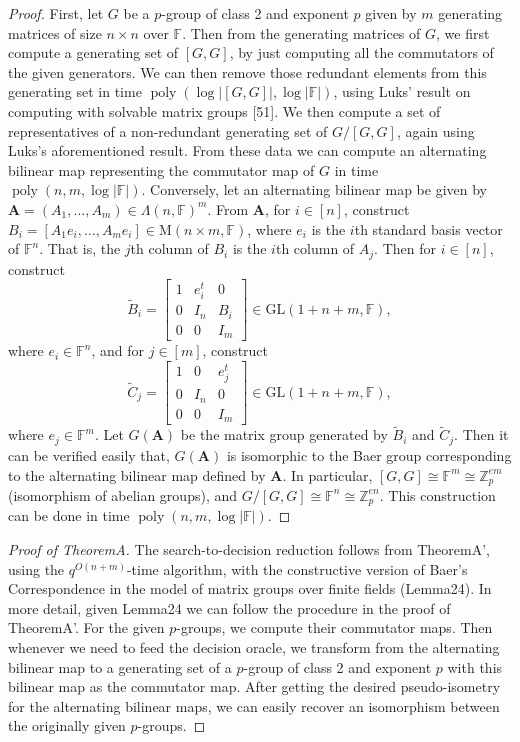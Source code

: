 \begin{proof}
First, let $G$ be a $p$-group of class 2 and exponent $p$ given by $m$ generating matrices of size $n\times n$ over $\mathbb F$. Then from the generating matrices of $G$, we first compute a generating set of $[G,G]$, by just computing all the commutators of the given generators. We can then remove those redundant elements from this generating set in time $\operatorname{poly}(\log|[G,G]|,\log|\mathbb F|)$, using Luks' result on computing with solvable matrix groups [51]. We then compute a set of representatives of a non-redundant generating set of $G/[G,G]$, again using Luks's aforementioned result. From these data we can compute an alternating bilinear map representing the commutator map of $G$ in time $\operatorname{poly}(n,m,\log|\mathbb F|)$.
Conversely, let an alternating bilinear map be given by $\mathbf A=(A_1,\ldots,A_m)\in\Lambda(n,\mathbb F)^m$. From $\mathbf A$, for $i\in[n]$, construct $B_i=[A_1e_i,\ldots,A_me_i]\in\mathrm M(n\times m,\mathbb F)$, where $e_i$ is the $i$th standard basis vector of $\mathbb F^n$. That is, the $j$th column of $B_i$ is the $i$th column of $A_j$. Then for $i\in[n]$, construct
\[\widetilde B_i=\begin{bmatrix}1&e_i^t&0\\0&I_n&B_i\\0&0&I_m\end{bmatrix}\in\mathrm{GL}(1+n+m,\mathbb F),\]
where $e_i\in\mathbb F^n$, and for $j\in[m]$, construct
\[\widetilde C_j=\begin{bmatrix}1&0&e_j^t\\0&I_n&0\\0&0&I_m\end{bmatrix}\in\mathrm{GL}(1+n+m,\mathbb F),\]
where $e_j\in\mathbb F^m$. Let $G(\mathbf A)$ be the matrix group generated by $\widetilde B_i$ and $\widetilde C_j$. Then it can be verified easily that, $G(\mathbf A)$ is isomorphic to the Baer group corresponding to the alternating bilinear map defined by $\mathbf A$. In particular, $[G,G]\cong\mathbb F^m\cong\mathbb Z_p^{em}$ (isomorphism of abelian groups), and $G/[G,G]\cong\mathbb F^n\cong\mathbb Z_p^{en}$. This construction can be done in time $\operatorname{poly}(n,m,\log|\mathbb F|)$.
\end{proof}
\begin{proof}[Proof of TheoremA]
The search-to-decision reduction follows from TheoremA', using the $q^{O(n+m)}$-time algorithm, with the constructive version of Baer's Correspondence in the model of matrix groups over finite fields (Lemma24).
In more detail, given Lemma24 we can follow the procedure in the proof of TheoremA'. For the given $p$-groups, we compute their commutator maps. Then whenever we need to feed the decision oracle, we transform from the alternating bilinear map to a generating set of a $p$-group of class 2 and exponent $p$ with this bilinear map as the commutator map. After getting the desired pseudo-isometry for the alternating bilinear maps, we can easily recover an isomorphism between the originally given $p$-groups.
\end{proof}
